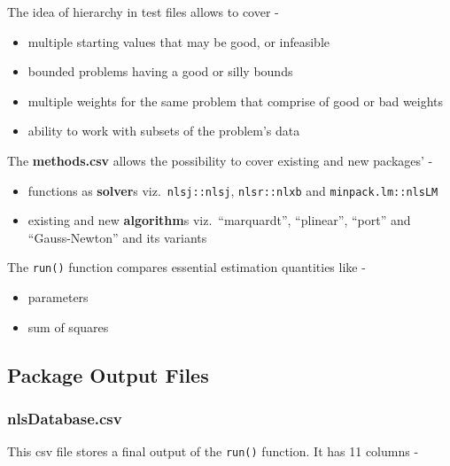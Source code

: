 The idea of hierarchy in test files allows to cover -

\begin{itemize}
\tightlist
\item
  multiple starting values that may be good, or infeasible
\item
  bounded problems having a good or silly bounds
\item
  multiple weights for the same problem that comprise of good or bad
  weights
\item
  ability to work with subsets of the problem's data
\end{itemize}

The \textbf{methods.csv} allows the possibility to cover existing and
new packages' -

\begin{itemize}
\tightlist
\item
  functions as \textbf{solver}s viz.~\texttt{nlsj::nlsj},
  \texttt{nlsr::nlxb} and \texttt{minpack.lm::nlsLM}
\item
  existing and new \textbf{algorithm}s viz.~``marquardt'', ``plinear'',
  ``port'' and ``Gauss-Newton'' and its variants
\end{itemize}

The \texttt{run()} function compares essential estimation quantities
like -

\begin{itemize}
\tightlist
\item
  parameters
\item
  sum of squares
\end{itemize}

\hypertarget{package-output-files}{%
\subsection{Package Output Files}\label{package-output-files}}

\hypertarget{nlsdatabase.csv}{%
\subsubsection{nlsDatabase.csv}\label{nlsdatabase.csv}}

This csv file stores a final output of the \texttt{run()} function. It
has 11 columns -

